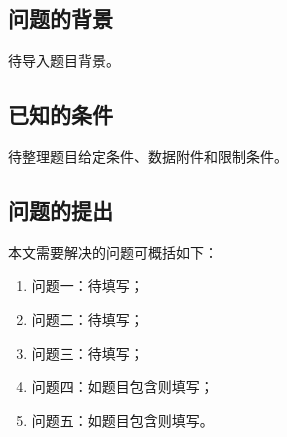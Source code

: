 \subsection{问题的背景}\label{sub:1.1}

待导入题目背景。

\subsection{已知的条件}\label{sub:1.2}

待整理题目给定条件、数据附件和限制条件。

\subsection{问题的提出}\label{sub:1.3}

本文需要解决的问题可概括如下：

\begin{enumerate}
  \item 问题一：待填写；
  \item 问题二：待填写；
  \item 问题三：待填写；
  \item 问题四：如题目包含则填写；
  \item 问题五：如题目包含则填写。
\end{enumerate}
